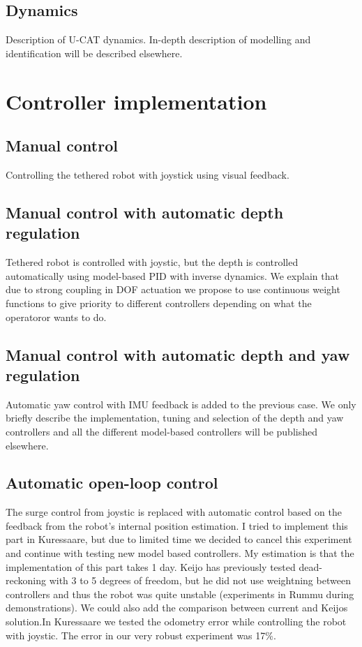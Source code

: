 \documentclass[conference]{IEEEtran}
\begin{document}
\subsection{Dynamics}
Description of U-CAT dynamics. In-depth description of modelling and identification will be described elsewhere.





\section{Controller implementation}

\subsection{Manual control}
Controlling the tethered robot with joystick using visual feedback.

\subsection{Manual control with automatic depth regulation}
Tethered robot is controlled with joystic, but the depth is controlled automatically using model-based PID with inverse dynamics. 
We explain that due to strong coupling in DOF actuation we propose to use continuous weight functions to give priority to different controllers depending on what the operatoror wants to do.

\subsection{Manual control with automatic depth and yaw regulation}
Automatic yaw control with IMU feedback is added to the previous case.
We only briefly describe the implementation, tuning and selection of
the depth and yaw controllers and all the different model-based controllers will be published elsewhere.

\subsection{Automatic open-loop control}
The surge control from joystic is replaced with automatic control based on the feedback from the robot's internal position estimation. 
I tried to implement this part in Kuressaare, but due to limited time we decided to cancel this experiment and continue with testing new model based controllers. 
My estimation is that the implementation of this part takes 1 day.
Keijo has previously tested dead-reckoning with 3 to 5 degrees of freedom, but he did not use weightning between controllers and thus the robot was quite unstable (experiments in Rummu during demonstrations).
We could also add the comparison between current and Keijos solution.In Kuressaare we tested the odometry error while controlling the robot with joystic. 
The error in our very robust experiment was 17\%.  
\end{document}
